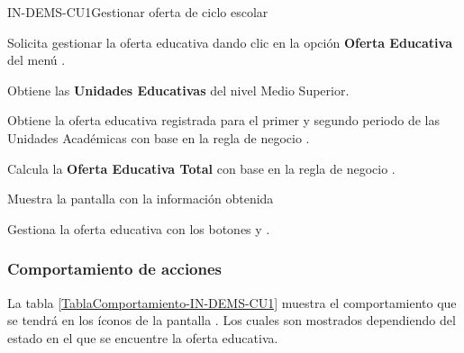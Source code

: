 \begin{UseCase}{IN-DEMS-CU1}{Gestionar oferta de ciclo escolar}
\end{UseCase}


\begin{UCtrayectoria}

	\UCpaso [\UCactor] Solicita gestionar la oferta educativa dando clic en la opción \textbf{Oferta Educativa} del menú .
	
	\UCpaso Obtiene las \textbf{Unidades Educativas} del nivel Medio Superior.
	
	\UCpaso Obtiene la oferta educativa registrada para el primer y segundo periodo de las Unidades Académicas con base en la regla de negocio .
	
	\UCpaso Calcula la \textbf{Oferta Educativa Total} con base en la regla de negocio .
	
	\UCpaso Muestra la pantalla  con la información obtenida

	\UCpaso [\UCactor] \label{IN-DEMS-CU1:Gestionar} Gestiona la oferta educativa con los botones \IUEditar y \IUArchivo.
\end{UCtrayectoria}

\subsubsection{Comportamiento de acciones}

La tabla \ref{TablaComportamiento-IN-DEMS-CU1} muestra el comportamiento que se tendrá en los íconos de la pantalla . Los cuales son mostrados dependiendo del estado en el que se encuentre la oferta educativa.

